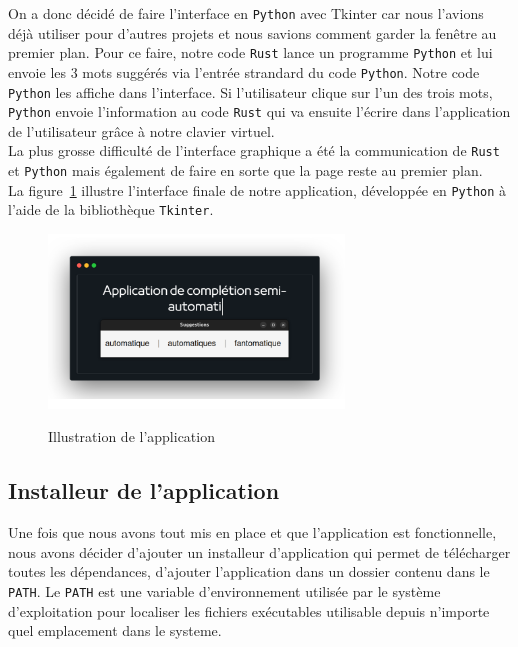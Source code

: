 \documentclass[a4paper, 11pt]{report}
\newcommand{\langage}[1]{\texttt{#1}}
\begin{document}
{On a donc décidé de faire l'interface en \langage{Python} avec Tkinter car nous l'avions déjà utiliser pour d'autres projets et nous savions comment garder la fenêtre au premier plan. Pour ce faire, notre code \langage{Rust} lance un programme \langage{Python} et lui envoie les 3 mots suggérés via l'entrée strandard du code \langage{Python}. Notre code \langage{Python} les affiche dans l'interface. Si l'utilisateur clique sur l'un des trois mots, \langage{Python} envoie l'information au code \langage{Rust} qui va ensuite l'écrire dans l'application de l'utilisateur grâce à notre clavier virtuel.\\

La plus grosse difficulté de l'interface graphique a été la communication de \langage{Rust} et \langage{Python} mais également de faire en sorte que la page reste au premier plan.\\

La figure~\ref{fig:lecture_fichier} illustre l’interface finale de notre application, développée en \langage{Python} à l’aide de la bibliothèque \langage{Tkinter}.

\begin{figure}[H]
	\begin{center}
		{\includegraphics[width=0.7\textwidth]{images/illustration.png}}
	\end{center}
	\caption{Illustration de l'application}
	\label{fig:lecture_fichier}
\end{figure}

\subsection{Installeur de l'application}

Une fois que nous avons tout mis en place et que l'application est fonctionnelle, nous avons décider d'ajouter un installeur d'application qui permet de télécharger toutes les dépendances, d'ajouter l'application dans un dossier contenu dans le \langage{PATH}. Le \langage{PATH} est une variable d'environnement utilisée par le système d'exploitation pour localiser les fichiers exécutables utilisable depuis n'importe quel emplacement dans le systeme.\\

}
\end{document}
